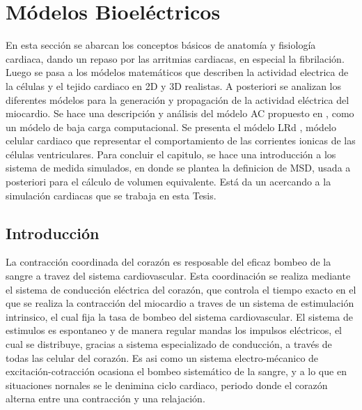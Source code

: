 \chapter{Módelos Bioeléctricos}

\begin{resumen}
  En esta sección se abarcan los conceptos básicos de anatomía y fisiología
  cardiaca, dando un repaso por las arritmias cardiacas, en especial la
  fibrilación. Luego se pasa a los módelos matemáticos que describen la
  actividad electrica de la células y el tejido  cardiaco en 2D y 3D realistas.
  A posteriori se analizan los diferentes módelos para la generación y
  propagación de la actividad eléctrica del miocardio. Se hace una descripción
  y análisis del módelo \ac{AC} propuesto en \cite{Alonso-Atienza05},  como un
  módelo de baja carga computacional. Se presenta el módelo \ac{LRd}
  \cite{luo1994, livshitz2007}, módelo celular cardiaco que representar el
  comportamiento de las corrientes ionicas de las células ventriculares. Para
  concluir el capitulo, se hace una introducción a los sistema de medida
  simulados, en donde se plantea la definicion de \ac{MSD}, usada a posteriori
  para el cálculo de volumen equivalente. Está da un acercando a la simulación cardiacas que se trabaja en esta Tesis.




\end{resumen}


\section{Introducción}

La contracción coordinada del corazón es resposable del eficaz bombeo de la
sangre a travez del sistema cardiovascular. Esta coordinación se realiza
mediante el sistema de conducción eléctrica del corazón, que controla el tiempo
exacto en el que se realiza la contracción del miocardio a traves de un sistema de
estimulación intrinsico, el cual fija la tasa de bombeo del sistema
cardiovascular. El sistema de estimulos es espontaneo y de manera regular mandas
los impulsos eléctricos, el cual se distribuye, gracias a sistema especializado
de conducción, a través de todas las celular del corazón. Es asi como un sistema
electro-mécanico de excitación-cotracción ocasiona el bombeo sistemático de la
sangre, y a lo que en situaciones nornales se le denimina ciclo cardiaco,
periodo donde el corazón alterna entre una contracción y una relajación.


